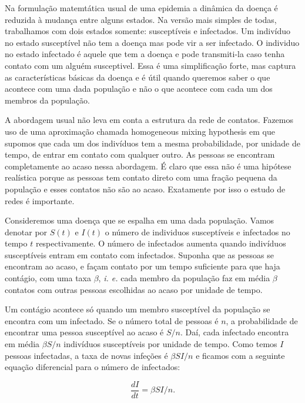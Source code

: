 \documentclass[a4paper,11pt]{report}
\begin{document}
Na formula\c{c}\~ao matemt\'atica usual de uma epidemia a din\^amica da doen\c{c}a \'e reduzida \`a mudan\c{c}a entre alguns estados. Na vers\~ao mais simples de todas, trabalhamos com dois estados somente: suscept\'iveis e infectados. Um indiv\'iduo no estado suscept\'ivel n\~ao tem a doen\c{c}a mas pode vir a ser infectado. O individuo no estado infectado \'e aquele que tem a doen\c{c}a e pode transmiti-la caso tenha contato com um algu\'em susceptivel. Essa \'e uma simplifica\c{c}\~ao forte, mas captura as caracter\'isticas b\'asicas da doen\c{c}a e \'e \'util quando queremos saber o que acontece com uma dada popula\c{c}\~ao e n\~ao o que acontece com cada um dos membros da popula\c{c}\~ao. 

A abordagem usual n\~ao leva em conta a estrutura da rede de contatos. Fazemos uso de uma aproxima\c{c}\~ao chamada homogeneous mixing hypothesis em que supomos que cada um dos indiv\'iduos tem a mesma probabilidade, por unidade de tempo, de entrar em contato com qualquer outro. As pessoas se encontram completamente ao acaso nessa abordagem. \'E claro que essa n\~ao \'e uma hip\'otese real\'istica porque as pessoas tem contato direto com uma fra\c{c}\~ao pequena da popula\c{c}\~ao e esses contatos n\~ao s\~ao ao acaso. Exatamente por isso o estudo de redes \'e importante. 


Consideremos uma doen\c{c}a que se espalha em uma dada popula\c{c}\~ao. Vamos denotar por $S(t)$ e $I(t)$ o n\'umero de individuos suscept\'iveis e infectados no tempo $t$ respectivamente. O n\'umero de infectados aumenta quando indiv\'iduos suscept\'iveis entram em contato com infectados. Suponha que as pessoas se encontram ao acaso, e fa\c{c}am contato por um tempo suficiente para que haja cont\'agio, com uma taxa $\beta$, \textit{i. e.} cada membro da popula\c{c}\~ao faz em m\'edia $\beta$ contatos com outras pessoas escolhidas ao acaso por unidade de tempo. 

Um cont\'agio acontece s\'o quando um membro suscept\'ivel da popula\c{c}\~ao se encontra com um infectado. Se o n\'umero total de pessoas \'e $n$, a probabilidade de encontrar uma pessoa suscept\'ivel ao acaso \'e $S/n$. Da\'i, cada infectado encontra em m\'edia $\beta S/n$ indiv\'iduos suscept\'iveis por unidade de tempo. Como temos $I$ pessoas infectadas, a taxa de novas infe\c{c}\~oes \'e $\beta SI/n$ e ficamos com a seguinte equa\c{c}\~ao diferencial para o n\'umero de infectados:

\begin{equation}
\frac{dI}{dt}=\beta SI/n.
\label{eq:inf-SI}
\end{equation}
\end{document}
